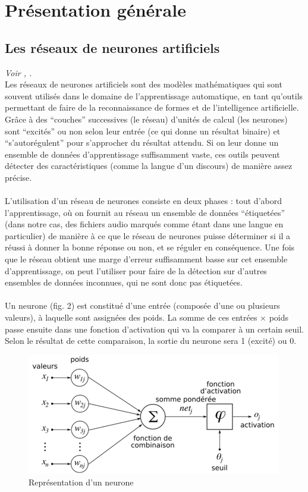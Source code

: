 \documentclass{article}
\begin{document}
\section{Présentation générale}

\subsection{Les réseaux de neurones artificiels}

\textit{Voir \cite{jodouin90}, \cite{lecun2015}.}\\

Les réseaux de neurones artificiels sont des modèles mathématiques qui sont souvent utilisés dans le domaine de l'apprentissage automatique, en tant qu'outils permettant de faire de la reconnaissance de formes et de l'intelligence artificielle. Grâce à des ``couches'' successives (le réseau) d'unités de calcul (les neurones) sont ``excités'' ou non selon leur entrée (ce qui donne un résultat binaire) et ``s'autorégulent'' pour s'approcher du résultat attendu. Si on leur donne un ensemble de données d'apprentissage suffisamment vaste, ces outils peuvent détecter des caractéristiques (comme la langue d'un discours) de manière assez précise.\\
\\
L'utilisation d'un réseau de neurones consiste en deux phases : tout d'abord l'apprentissage, où on fournit au réseau un ensemble de données ``étiquetées'' (dans notre cas, des fichiers audio marqués comme étant dans une langue en particulier) de manière à ce que le réseau de neurones puisse déterminer si il a réussi à donner la bonne réponse ou non, et se réguler en conséquence. Une fois que le réseau obtient une marge d'erreur suffisamment basse sur cet ensemble d'apprentissage, on peut l'utiliser pour faire de la détection sur d'autres ensembles de données inconnues, qui ne sont donc pas étiquetées.\\
\\
Un neurone (fig. 2) est constitué d'une entrée (composée d'une ou plusieurs valeurs), à laquelle sont assignées des poids. La somme de ces entrées $\times$ poids passe ensuite dans une fonction d'activation qui va la comparer à un certain seuil. Selon le résultat de cette comparaison, la sortie du neurone sera 1 (excité) ou 0.\\

\begin{figure}[h]
  \centerline{\includegraphics[scale=0.6]{img/neurone.png}}
  \caption{Représentation d'un neurone}
\end{figure}
\end{document}
